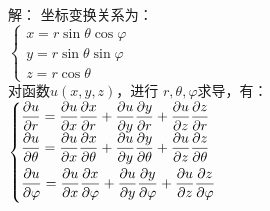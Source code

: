 	  {}	  
	{\alert{解：}}  坐标变换关系为：\\
	$\begin{cases}
		x= r\sin \theta \cos \varphi \\
		y= r\sin \theta \sin \varphi \\
		z=r\cos \theta
	\end{cases} $ \\
	对函数$u(x,y,z)$，进行 $r, \theta, \varphi $求导，有：\\ \vspace{0.6em}
	{\small $\begin{cases}
		\dfrac{\partial {u}}{\partial {r}}=\dfrac{\partial {u}}{\partial x} \dfrac{\partial {x}}{\partial {r}}+\dfrac{\partial u}{\partial {y}} \dfrac{\partial {y}}{\partial {r}}+\dfrac{\partial u}{\partial z} \dfrac{\partial z}{\partial {r}} \\ \vspace{0.3em}
		\dfrac{\partial {u}}{\partial \theta}=\dfrac{\partial {u}}{\partial x} \dfrac{\partial{x}}{\partial \theta}+\dfrac{\partial u}{\partial {y}} \dfrac{\partial {y}}{\partial \theta}+\dfrac{\partial{u}}{\partial z} \dfrac{\partial z}{\partial \theta} \\ \vspace{0.3em}
		\dfrac{\partial {u}}{\partial \varphi}=\dfrac{\partial u}{\partial x} \dfrac{\partial{x}}{\partial \varphi}+\dfrac{\partial u}{\partial y} \dfrac{\partial y}{\partial \varphi}+\dfrac{\partial u}{\partial z} \dfrac{\partial z}{\partial \varphi}
	\end{cases} $}\\ \vspace{1em}
	


